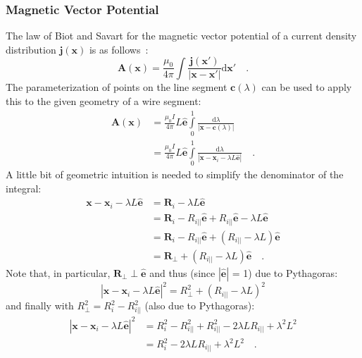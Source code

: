 \subsubsection{Magnetic Vector Potential}
The law of Biot and Savart for the magnetic vector potential of a current density distribution $\mathbf{j}(\mathbf{x})$ is as follows~\cite{jackson}:
\begin{equation}
 \mathbf{A}(\mathbf{x}) = \frac{\mu_0}{4 \pi} \int \frac{\mathbf{j}(\mathbf{x}')}{|\mathbf{x} - \mathbf{x}'|} \mathrm{d}\mathbf{x}' \quad .
\end{equation}
The parameterization of points on the line segment $\mathbf{c}(\lambda)$ can be used to apply this to the given geometry of a wire segment:
\begin{align}
 \mathbf{A}(\mathbf{x}) & = \frac{\mu_0 I}{4 \pi} L \hat{\mathbf{e}} \int\limits_0^1 \frac{\mathrm{d}\lambda}{|\mathbf{x} - \mathbf{c}(\lambda)|} \\
        ~               & = \frac{\mu_0 I}{4 \pi} L \hat{\mathbf{e}} \int\limits_0^1 \frac{\mathrm{d}\lambda}{|\mathbf{x} - \mathbf{x}_i - \lambda L \hat{\mathbf{e}}|} \quad .
\end{align}
A little bit of geometric intuition is needed to simplify the denominator of the integral:
\begin{align}
 \mathbf{x} - \mathbf{x}_i - \lambda L \hat{\mathbf{e}}
   & = \mathbf{R}_i - \lambda L \hat{\mathbf{e}} \\
 ~ & = \mathbf{R}_i - R_{i ||} \hat{\mathbf{e}} + R_{i ||} \hat{\mathbf{e}} - \lambda L \hat{\mathbf{e}} \\
 ~ & = \mathbf{R}_i - R_{i ||} \hat{\mathbf{e}} + \left( R_{i ||} - \lambda L \right) \hat{\mathbf{e}} \\
 ~ & = \mathbf{R}_\perp + \left( R_{i ||} - \lambda L \right) \hat{\mathbf{e}} \quad .
\end{align}
Note that, in particular, $\mathbf{R}_\perp \perp \hat{\mathbf{e}}$ and thus (since $|\hat{\mathbf{e}}|$ = 1) due to Pythagoras:
\begin{equation}
 | \mathbf{x} - \mathbf{x}_i - \lambda L \hat{\mathbf{e}} |^2 = R_\perp^2 + \left( R_{i ||} - \lambda L \right)^2
\end{equation}
and finally with $R_\perp^2 = R_i^2 - R_{i ||}^2$ (also due to Pythagoras):
\begin{align}
 | \mathbf{x} - \mathbf{x}_i - \lambda L \hat{\mathbf{e}} |^2
   & = R_i^2 - R_{i ||}^2 + R_{i ||}^2 - 2 \lambda L R_{i ||} + \lambda^2 L^2 \\
 ~ & = R_i^2 - 2 \lambda L R_{i ||} + \lambda^2 L^2 \quad .
\end{align}
